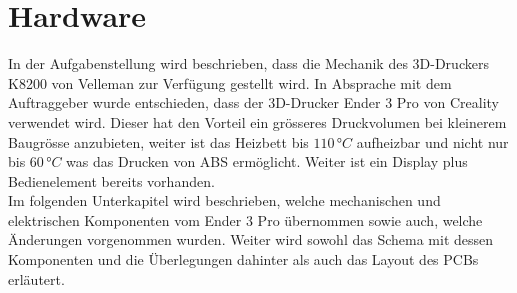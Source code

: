 \section{Hardware}
\label{sec:Hardware}


In der Aufgabenstellung wird beschrieben, dass die Mechanik des 3D-Druckers K8200 von Velleman zur Verfügung gestellt wird. In Absprache mit dem Auftraggeber wurde entschieden, dass der 3D-Drucker Ender 3 Pro von Creality verwendet wird. Dieser hat den Vorteil ein grösseres Druckvolumen bei kleinerem Baugrösse anzubieten, weiter ist das Heizbett bis $110 \,\si{\degree C}$ aufheizbar und nicht nur  bis $60 \,\si{\degree C}$ was das Drucken von ABS ermöglicht. Weiter ist ein Display plus Bedienelement bereits vorhanden.\\
Im folgenden Unterkapitel wird beschrieben, welche mechanischen und elektrischen Komponenten vom Ender 3 Pro übernommen sowie auch, welche Änderungen vorgenommen wurden. Weiter wird sowohl das Schema mit dessen Komponenten und die Überlegungen dahinter als auch das Layout des PCBs erläutert.
